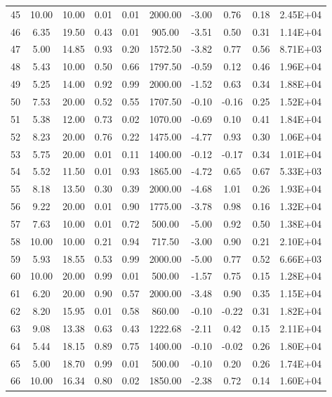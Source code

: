 \begin{landscape}
\begin{center}
\begin{longtable}{|c|c|c|c|c|c|c|c|c|c|}
45 & 10.00 & 10.00 & 0.01 & 0.01 & 2000.00 & -3.00 & 0.76  & 0.18 & 2.45E+04 \\
46 & 6.35  & 19.50 & 0.43 & 0.01 & 905.00  & -3.51 & 0.50  & 0.31 & 1.14E+04 \\
47 & 5.00  & 14.85 & 0.93 & 0.20 & 1572.50 & -3.82 & 0.77  & 0.56 & 8.71E+03 \\
48 & 5.43  & 10.00 & 0.50 & 0.66 & 1797.50 & -0.59 & 0.12  & 0.46 & 1.96E+04 \\
49 & 5.25  & 14.00 & 0.92 & 0.99 & 2000.00 & -1.52 & 0.63  & 0.34 & 1.88E+04 \\
50 & 7.53  & 20.00 & 0.52 & 0.55 & 1707.50 & -0.10 & -0.16 & 0.25 & 1.52E+04 \\
51 & 5.38  & 12.00 & 0.73 & 0.02 & 1070.00 & -0.69 & 0.10  & 0.41 & 1.84E+04 \\
52 & 8.23  & 20.00 & 0.76 & 0.22 & 1475.00 & -4.77 & 0.93  & 0.30 & 1.06E+04 \\
53 & 5.75  & 20.00 & 0.01 & 0.11 & 1400.00 & -0.12 & -0.17 & 0.34 & 1.01E+04 \\
54 & 5.52  & 11.50 & 0.01 & 0.93 & 1865.00 & -4.72 & 0.65  & 0.67 & 5.33E+03 \\
55 & 8.18  & 13.50 & 0.30 & 0.39 & 2000.00 & -4.68 & 1.01  & 0.26 & 1.93E+04 \\
56 & 9.22  & 20.00 & 0.01 & 0.90 & 1775.00 & -3.78 & 0.98  & 0.16 & 1.32E+04 \\
57 & 7.63  & 10.00 & 0.01 & 0.72 & 500.00  & -5.00 & 0.92  & 0.50 & 1.38E+04 \\
58 & 10.00 & 10.00 & 0.21 & 0.94 & 717.50  & -3.00 & 0.90  & 0.21 & 2.10E+04 \\
59 & 5.93  & 18.55 & 0.53 & 0.99 & 2000.00 & -5.00 & 0.77  & 0.52 & 6.66E+03 \\
60 & 10.00 & 20.00 & 0.99 & 0.01 & 500.00  & -1.57 & 0.75  & 0.15 & 1.28E+04 \\
61 & 6.20  & 20.00 & 0.90 & 0.57 & 2000.00 & -3.48 & 0.90  & 0.35 & 1.15E+04 \\
62 & 8.20  & 15.95 & 0.01 & 0.58 & 860.00  & -0.10 & -0.22 & 0.31 & 1.82E+04 \\
63 & 9.08  & 13.38 & 0.63 & 0.43 & 1222.68 & -2.11 & 0.42  & 0.15 & 2.11E+04 \\
64 & 5.44  & 18.15 & 0.89 & 0.75 & 1400.00 & -0.10 & -0.02 & 0.26 & 1.80E+04 \\
65 & 5.00  & 18.70 & 0.99 & 0.01 & 500.00  & -0.10 & 0.20  & 0.26 & 1.74E+04 \\
66 & 10.00 & 16.34 & 0.80 & 0.02 & 1850.00 & -2.38 & 0.72  & 0.14 & 1.60E+04 \\

\end{longtable}
\end{center}
\end{landscape}
